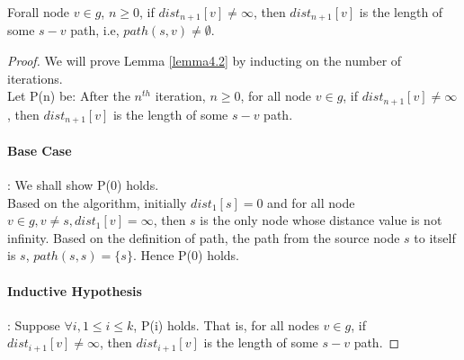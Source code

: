 \begin{sublemma} \label{lemma4.2}
Forall node $v \in g$, $n \geq 0$, if $dist_{n+1}[v] \neq \infty$, then $dist_{n+1}[v]$ is the length of some $s-v$ path, i.e, $path(s, v) \neq \emptyset$.  
\end{sublemma}
\begin{proof}
We will prove Lemma \ref{lemma4.2} by inducting on the number of iterations. 
\\
Let P(n) be: After the $n^{th}$ iteration, $n \geq 0$, for all node $v \in g$, if $dist_{n+1}[v] \neq \infty$, then $dist_{n+1}[v]$ is the length of some $s-v$ path. 

\paragraph*{Base Case}: We shall show P(0) holds. 
\\
Based on the algorithm, initially $dist_1[s] = 0$ and for all node $v \in g, v \neq s, dist_1[v] = \infty$, then $s$ is the only node whose distance value is not infinity. Based on the definition of path, the path from the source node $s$ to itself is $s$, $path(s, s) = \{s\}$. Hence P(0) holds. 

\paragraph*{Inductive Hypothesis}: Suppose $\forall i, 1 \leq i \leq k$, P(i) holds. That is, for all nodes $v \in g$, if $dist_{i+1}[v] \neq \infty$, then $dist_{i+1}[v]$ is the length of some $s-v$ path. 


\end{proof}
